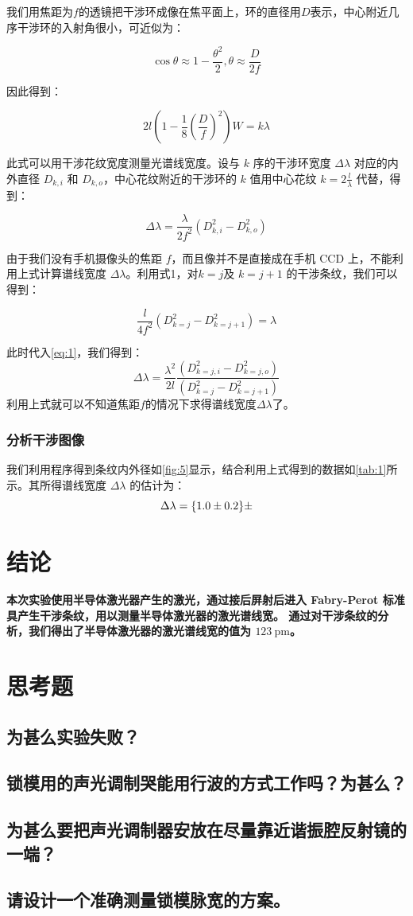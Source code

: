 \documentclass[font=default]{mpltx}
\begin{document}
我们用焦距为$f$的透镜把干涉环成像在焦平面上，环的直径用$D$表示，中心附近几序干涉环的入射角很小，可近似为：

$$\cos{\theta} \approx 1 − \frac{\theta^2}{2}, \theta \approx \frac{D}{2f}$$

因此得到：

$$2l\left(1-\frac{1}{8}\left(\frac{D}{f}\right)^2\right)W=k\lambda$$

此式可以用干涉花纹宽度测量光谱线宽度。设与 $k$ 序的干涉环宽度 $\Delta\lambda$ 对应的内外直径 $D_{k,i}$ 和 $D_{k,o}$，中心花纹附近的干涉环的 $k$ 值用中心花纹 $k =2\frac{l}{\lambda}$ 代替，得到：

\begin{equation}\label{eq:1}
	\Delta\lambda = \frac{\lambda}{2f^2}(D^2_{k,i}-D^2_{k,o})
\end{equation}

由于我们没有手机摄像头的焦距 $f$，而且像并不是直接成在手机 CCD 上，不能利用上式计算谱线宽度 $\Delta\lambda$。利用式1，对$k = j$及 $k = j + 1$ 的干涉条纹，我们可以得到：

$$\frac{l}{4f^2}(D^2_{k=j}-D^2_{k=j+1})=\lambda$$

此时代入\autoref{eq:1}，我们得到：
\begin{equation}\label{eq:2}
	\Delta \lambda = \frac{\lambda^2}{2l}\frac{(D^2_{k=j,i}-D^2_{k=j,o})}{(D^2_{k=j}-D^2_{k=j+1})}
\end{equation}
利用上式就可以不知道焦距$f$的情况下求得谱线宽度$\Delta\lambda$了。
\subsubsection{分析干涉图像}
我们利用程序得到条纹内外径如\autoref{fig:5}显示，结合利用上式得到的数据如\autoref{tab:1}所示。其所得谱线宽度 $\Delta\lambda$ 的估计为：
$$\Delta\lambda=\qty{1.0\pm0.2}{\pm}$$

\section{结论}
\textbf{本次实验使用半导体激光器产生的激光，通过接后屏射后进入 Fabry-Perot 标准具产生干涉条纹，用以测量半导体激光器的激光谱线宽。
	通过对干涉条纹的分析，我们得出了半导体激光器的激光谱线宽的值为 $\qty{123}{\pm}$。}



\clearpage %
\appendix %
\section{思考题}\label{app:exercise}
\subsection{为甚么实验失败？}
\subsection{锁模用的声光调制哭能用行波的方式工作吗？为甚么？}
\subsection{为甚么要把声光调制器安放在尽量靠近谐振腔反射镜的一端？}
\subsection{请设计一个准确测量锁模脉宽的方案。}
\end{document}
